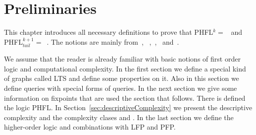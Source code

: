 \chapter{Preliminaries}
\label{ch:preliminaries}
This chapter introduces all necessary definitions to prove that PHFL$^k =$~ and
PHFL$^{k+1}_{tail} =$~. The notions are mainly from~\cite{immerman1999descriptive},
~\cite{papadimitriou1994complexity},~\cite{otto1999bisimulation},~\cite{freireMartins2011descriptive}
and~\cite{lange2014capturing}.

We assume that the reader is already familiar with basic notions of first order logic and 
computational complexity. In the first section we define a special kind of graphs called LTS and 
define some properties on it. Also in this section we define queries with special forms of queries. 
In the next section we give some information on fixpoints that are used the section that follows. 
There is defined the logic PHFL. In Section~\ref{sec:descriptiveComplexity} we present the 
descriptive complexity and the complexity clases  and . In the last section we define the higher-order logic and combinations with LFP and PFP.










